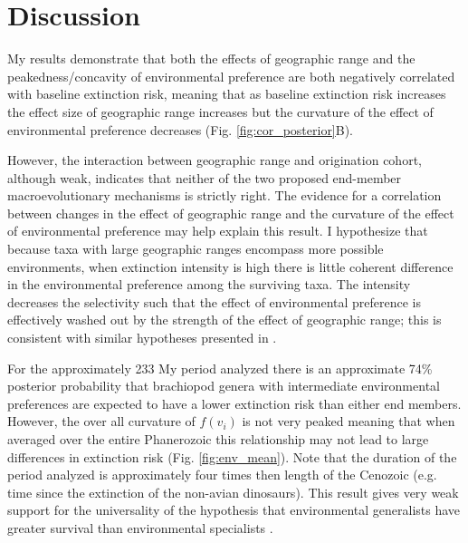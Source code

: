 \documentclass{article}
\begin{document}
\section{Discussion}

My results demonstrate that both the effects of geographic range and the peakedness/concavity of environmental preference are both negatively correlated with baseline extinction risk, meaning that as baseline extinction risk increases the effect size of geographic range increases but the curvature of the effect of environmental preference decreases (Fig. \ref{fig:cor_posterior}B). 

However, the interaction between geographic range and origination cohort, although weak, indicates that neither of the two proposed end-member macroevolutionary mechanisms is strictly right. The evidence for a correlation between changes in the effect of geographic range and the curvature of the effect of environmental preference may help explain this result. I hypothesize that because taxa with large geographic ranges encompass more possible environments, when extinction intensity is high there is little coherent difference in the environmental preference among the surviving taxa. The intensity decreases the selectivity such that the effect of environmental preference is effectively washed out by the strength of the effect of geographic range; this is consistent with similar hypotheses presented in \citet{Raup1991b}. 

For the approximately 233 My period analyzed there is an approximate 74\% posterior probability that brachiopod genera with intermediate environmental preferences are expected to have a lower extinction risk than either end members. However, the over all curvature of \(f(v_{i})\) is not very peaked meaning that when averaged over the entire Phanerozoic this relationship may not lead to large differences in extinction risk (Fig. \ref{fig:env_mean}). Note that the duration of the period analyzed is approximately four times then length of the Cenozoic (e.g. time since the extinction of the non-avian dinosaurs). This result gives very weak support for the universality of the hypothesis that environmental generalists have greater survival than environmental specialists \citep{Simpson1944,Liow2004a,Liow2007b,Nurnberg2013a,Nurnberg2015}.
\end{document}
